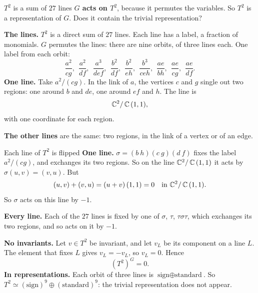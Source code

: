 \begin{frame}{\(T^2\) is a sum of \(27\) lines}
\textbf{\(G\) acts on \(T^2\)}, because it permutes the variables. So \(T^2\) is a representation of \(G\). Does it contain the trivial representation?
\par
\textbf{The lines.} \(T^2\) is a direct sum of \(27\) lines. Each line has a label, a fraction of monomials. \(G\) permutes the lines: there are nine orbits, of three lines each. One label from each orbit:
\[
\frac{a^2}{cg},\ \ \frac{a^2}{df},\ \ \frac{a^3}{def},\ \ \frac{b^2}{df},\ \ \frac{b^2}{eh},\ \ \frac{b^3}{ceh},\ \ \frac{ae}{bh},\ \ \frac{ae}{cg},\ \ \frac{ae}{df}.
\]
\textbf{One line.} Take \(a^2/(cg)\). In the link of \(a\), the vertices \(c\) and \(g\) single out two regions: one around \(b\) and \(de\), one around \(ef\) and \(h\). The line is
\[
\mathbb C^2/\,\mathbb C\,(1,1),
\]
with one coordinate for each region.
\par
\textbf{The other lines} are the same: two regions, in the link of a vertex or of an edge.
\end{frame}

\begin{frame}{Each line of \(T^2\) is flipped}
\textbf{One line.} \(\sigma=(b\ h)(c\ g)(d\ f)\) fixes the label \(a^2/(cg)\), and exchanges its two regions. So on the line \(\mathbb C^2/\,\mathbb C\,(1,1)\) it acts by \(\sigma(u,v)=(v,u)\). But
\[
(u,v)+(v,u)=(u+v)\,(1,1)=0\quad\text{in }\mathbb C^2/\,\mathbb C\,(1,1).
\]
So \(\sigma\) acts on this line by \(-1\).
\par
\textbf{Every line.} Each of the \(27\) lines is fixed by one of \(\sigma\), \(\tau\), \(\tau\sigma\tau\), which exchanges its two regions, and so acts on it by \(-1\).
\par
\textbf{No invariants.} Let \(v\in T^2\) be invariant, and let \(v_L\) be its component on a line \(L\). The element that fixes \(L\) gives \(v_L=-v_L\), so \(v_L=0\). Hence
\[
\boxed{(T^2)^G=0.}
\]
\textbf{In representations.} Each orbit of three lines is \(\text{sign}\oplus\text{standard}\). So
\(T^2\simeq(\text{sign})^{9}\oplus(\text{standard})^{9}\): the trivial representation does not appear.
\src{\textcolor{red}{Not re-checked for this slide. ``In representations'' is deduced here from the table of the lines.}}
\end{frame}

